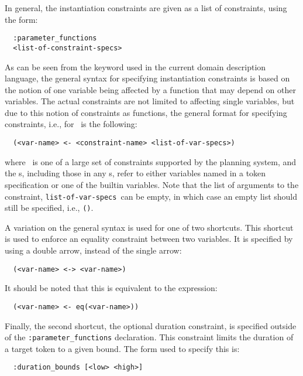 In general, the instantiation constraints are given as a list of
constraints, using the form:
  \begin{verbatim}
  :parameter_functions
  <list-of-constraint-specs> \end{verbatim}
  As can be seen from the keyword used in the current domain
description language, the general syntax for specifying instantiation
constraints is based on the notion of one variable being affected by a
function that may depend on other variables.  The actual constraints
are not limited to affecting single variables, but due to this notion
of constraints as functions, the general format for specifying
constraints, i.e., for {\tt <constraint-spec>}\ is the following:
  \begin{verbatim}
  (<var-name> <- <constraint-name> <list-of-var-specs>)
\end{verbatim}
where {\tt <constriant-name>}\ is one of a large set of constraints
supported by the planning system, and the {\tt <var-name>}s, including
those in any {\tt <var-specr>}s, refer to either variables named in a
token specification or one of the builtin variables.  Note that the
list of arguments to the constraint, {\tt list-of-var-specs}\ can be
empty, in which case an empty list should still be specified, i.e.,
{\tt ()}.  

A variation on the general syntax is used for one of two shortcuts. 
This shortcut is used to enforce an equality constraint between two
variables.  It is specified by using a double arrow, instead of the
single arrow:
  \begin{verbatim}
  (<var-name> <-> <var-name>)  \end{verbatim}
  It should be noted that this is equivalent to the expression:
  \begin{verbatim}
  (<var-name> <- eq(<var-name>))  \end{verbatim}

Finally, the second shortcut, the optional duration constraint, is
specified outside of the {\tt :parameter\_functions} declaration. 
This constraint limits the duration of a target token to a given
bound.  The form used to specify this is:
  \begin{verbatim}
  :duration_bounds [<low> <high>]  \end{verbatim}

